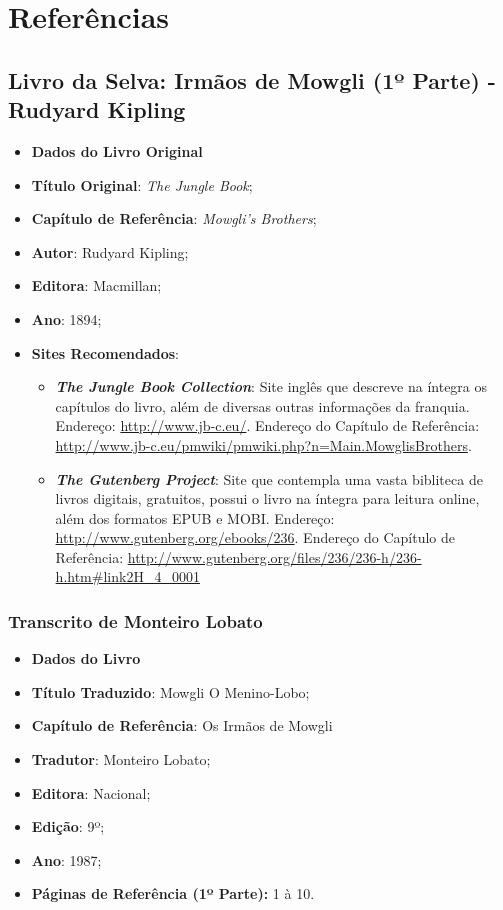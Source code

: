 \chapter[Referências]{Referências}
\label{chap:referencias}
	\section[Livro da Selva: Irmãos de Mowgli (1º Parte) - Rudyard Kipling]{Livro da Selva: Irmãos de Mowgli (1º Parte) - Rudyard Kipling}
	\label{sec:referencias_livroDaSelva}
		\begin{itemize}
			\item[]{\textbf{Dados do Livro Original}}
			\item{\textbf{Título Original}: \emph{The Jungle Book};}
			\item{\textbf{Capítulo de Referência}: \emph{Mowgli's Brothers};}
			\item{\textbf{Autor}: Rudyard Kipling;}
			\item{\textbf{Editora}: Macmillan;}
			\item{\textbf{Ano}: 1894;}
			\item{\textbf{Sites Recomendados}:
				\begin{itemize}
					\item{\textbf{\emph{The Jungle Book Collection}}: Site inglês que descreve na íntegra os capítulos do livro, além de diversas outras informações da franquia. Endereço: \url{http://www.jb-c.eu/}. Endereço do Capítulo de Referência: \url{http://www.jb-c.eu/pmwiki/pmwiki.php?n=Main.MowglisBrothers}.}
					\item{\textbf{\emph{The Gutenberg Project}}: Site que contempla uma vasta bibliteca de livros digitais, gratuitos, possui o livro na íntegra para leitura online, além dos formatos EPUB e MOBI. Endereço: \url{http://www.gutenberg.org/ebooks/236}. Endereço do Capítulo de Referência: \url{http://www.gutenberg.org/files/236/236-h/236-h.htm#link2H_4_0001}}
				\end{itemize}}
		\end{itemize}

		\subsection[Transcrito de Monteiro Lobato]{Transcrito de Monteiro Lobato}
		\label{sec:referencias_livroDaSelva}
			\begin{itemize}
				\item[]{\textbf{Dados do Livro}}
				\item{\textbf{Título Traduzido}: Mowgli O Menino-Lobo;}
				\item{\textbf{Capítulo de Referência}: Os Irmãos de Mowgli}
				\item{\textbf{Tradutor}: Monteiro Lobato;}
				\item{\textbf{Editora}: Nacional;}
				\item{\textbf{Edição}: 9º;}
				\item{\textbf{Ano}: 1987;}
				\item{\textbf{Páginas de Referência (1º Parte):} 1 à 10.}
			\end{itemize}

